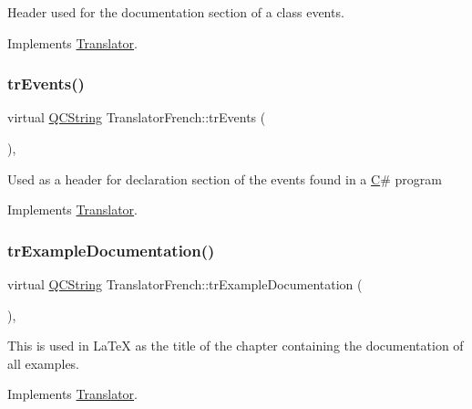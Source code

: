 Header used for the documentation section of a class\textquotesingle{} events. 

Implements \mbox{\hyperlink{class_translator}{Translator}}.

\mbox{\label{class_translator_french_a6896b520f200ba715f988194ce43c3e8}} 
\subsubsection{\texorpdfstring{trEvents()}{trEvents()}}
{\footnotesize\ttfamily virtual \mbox{\hyperlink{class_q_c_string}{Q\+C\+String}} Translator\+French\+::tr\+Events (\begin{DoxyParamCaption}{ }\end{DoxyParamCaption})\hspace{0.3cm}{\ttfamily [inline]}, {\ttfamily [virtual]}}

Used as a header for declaration section of the events found in a \mbox{\hyperlink{class_c}{C}}\# program 

Implements \mbox{\hyperlink{class_translator}{Translator}}.

\mbox{\label{class_translator_french_a51983c95f8f839bb10b2719fdd2c092b}} 
\subsubsection{\texorpdfstring{trExampleDocumentation()}{trExampleDocumentation()}}
{\footnotesize\ttfamily virtual \mbox{\hyperlink{class_q_c_string}{Q\+C\+String}} Translator\+French\+::tr\+Example\+Documentation (\begin{DoxyParamCaption}{ }\end{DoxyParamCaption})\hspace{0.3cm}{\ttfamily [inline]}, {\ttfamily [virtual]}}

This is used in La\+TeX as the title of the chapter containing the documentation of all examples. 

Implements \mbox{\hyperlink{class_translator}{Translator}}.

\mbox{\label{class_translator_french_af8019639b1b4f34c0f4b310f20a450dd}} 
